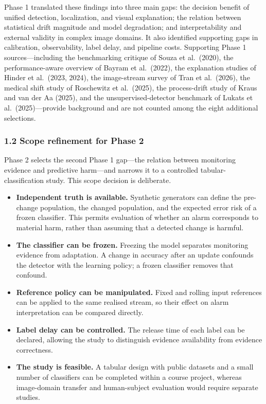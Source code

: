 \documentclass[
]{article}
\providecommand{\tightlist}{%
  \setlength{\itemsep}{0pt}\setlength{\parskip}{0pt}}
\begin{document}
Phase 1 translated these findings into three main gaps: the decision
benefit of unified detection, localization, and visual explanation; the
relation between statistical drift magnitude and model degradation; and
interpretability and external validity in complex image domains. It also
identified supporting gaps in calibration, observability, label delay,
and pipeline costs. Supporting Phase 1 sources---including the
benchmarking critique of Souza et al.~(2020), the performance-aware
overview of Bayram et al.~(2022), the explanation studies of Hinder et
al.~(2023, 2024), the image-stream survey of Tran et al.~(2026), the
medical shift study of Roschewitz et al.~(2025), the process-drift study
of Kraus and van der Aa (2025), and the unsupervised-detector benchmark
of Lukats et al.~(2025)---provide background and are not counted among
the eight additional selections.

\hypertarget{scope-refinement-for-phase-2}{%
\subsubsection{1.2 Scope refinement for Phase
2}\label{scope-refinement-for-phase-2}}

Phase 2 selects the second Phase 1 gap---the relation between monitoring
evidence and predictive harm---and narrows it to a controlled
tabular-classification study. This scope decision is deliberate.

\begin{itemize}
\tightlist
\item
  \textbf{Independent truth is available.} Synthetic generators can
  define the pre-change population, the changed population, and the
  expected error risk of a frozen classifier. This permits evaluation of
  whether an alarm corresponds to material harm, rather than assuming
  that a detected change is harmful.
\item
  \textbf{The classifier can be frozen.} Freezing the model separates
  monitoring evidence from adaptation. A change in accuracy after an
  update confounds the detector with the learning policy; a frozen
  classifier removes that confound.
\item
  \textbf{Reference policy can be manipulated.} Fixed and rolling input
  references can be applied to the same realised stream, so their effect
  on alarm interpretation can be compared directly.
\item
  \textbf{Label delay can be controlled.} The release time of each label
  can be declared, allowing the study to distinguish evidence
  availability from evidence correctness.
\item
  \textbf{The study is feasible.} A tabular design with public datasets
  and a small number of classifiers can be completed within a course
  project, whereas image-domain transfer and human-subject evaluation
  would require separate studies.
\end{itemize}
\end{document}
